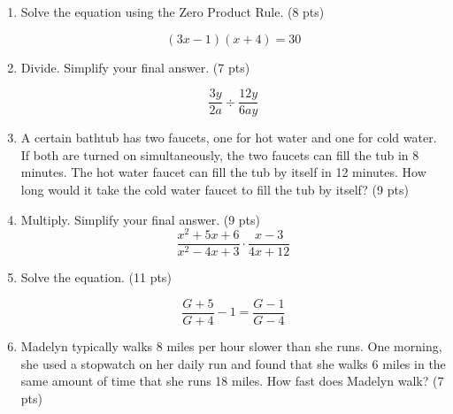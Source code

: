 \documentclass{ximera}
\begin{document}
\begin{enumerate}
\item Solve the equation using the Zero Product Rule. (8 pts)

$$(3 x-1)(x+4)=30$$

\item Divide. Simplify your final answer. (7 pts)

$$\frac{3 y}{2 a} \div \frac{12 y}{6 a y}$$

\item A certain bathtub has two faucets, one for hot water and one for cold water. If both are turned on simultaneously, the two faucets can fill the tub in 8 minutes. The hot water faucet can fill the tub by itself in 12 minutes. How long would it take the cold water faucet to fill the tub by itself? (9 pts)

\item Multiply. Simplify your final answer. (9 pts)\\
$$\frac{x^{2}+5 x+6}{x^{2}-4 x+3} \cdot \frac{x-3}{4 x+12}$$

\item Solve the equation. (11 pts)

$$\frac{G+5}{G+4}-1=\frac{G-1}{G-4}$$

\item Madelyn typically walks 8 miles per hour slower than she runs. One morning, she used a stopwatch on her daily run and found that she walks 6 miles in the same amount of time that she runs 18 miles. How fast does Madelyn walk? (7 pts)

\end{enumerate}
\end{document}
